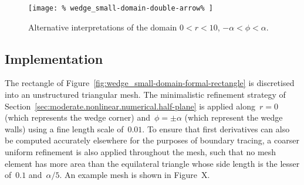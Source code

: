\begin{figure}
  \newcommand*{\subfigurewidth}{0.3\textwidth}
  \centering
  \hspace*{\fill}
  \begin{subfigure}[t]{\subfigurewidth}
  \end{subfigure}
    \hfill
  \begin{minipage}[t]{0.25\textwidth}
    \centering
    \texttt{[image: \%
      wedge\_small-domain-double-arrow\%
    ]}
  \end{minipage}
    \hfill
  \begin{subfigure}[t]{\subfigurewidth}
  \end{subfigure}
  \hspace*{\fill}
  \caption{
    Alternative interpretations of the domain
    $0 < r < 10$, $-\alpha < \phi < \alpha$.
  }
  \label{fig:wedge_small-domain}
\end{figure}

\subsection{Implementation}
\label{sec:small.numerical.implementation}

The rectangle of Figure~\ref{fig:wedge_small-domain-formal-rectangle}
is discretised into an unstructured triangular mesh.
The minimalistic refinement strategy
of Section~\ref{sec:moderate.nonlinear.numerical.half-plane}
is applied
along~$r = 0$ (which represents the wedge corner)
and~$\phi = \pm\alpha$ (which represent the wedge walls)
using a fine length scale of~$0.01$.
To ensure that first derivatives
can also be computed accurately elsewhere
for the purposes of boundary tracing,
a coarser uniform refinement is also applied throughout the mesh,
such that no mesh element has more area than the equilateral triangle
whose side length is the lesser of~$0.1$ and~$\alpha / 5$.
An example mesh is shown in
Figure~X\@. %

